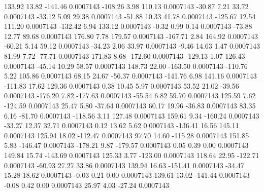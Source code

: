       133.92       13.82     -141.46     0.0007143
     -108.26        3.98      110.13     0.0007143
      -30.87        7.21       33.72     0.0007143
      -33.12        5.09       29.38     0.0007143
      -51.88       10.33       41.78     0.0007143
     -125.67       12.54      111.20     0.0007143
     -132.42        6.94      133.12     0.0007143
       -0.32        0.99        0.14     0.0007143
      -73.88       12.77       89.68     0.0007143
      176.80        7.78      179.57     0.0007143
     -167.71        2.84      164.92     0.0007143
      -60.21        5.14       59.12     0.0007143
      -34.23        2.06       33.97     0.0007143
       -9.46       14.63        1.47     0.0007143
       81.99        7.72      -77.71     0.0007143
      171.83        8.68     -172.60     0.0007143
     -129.13        1.07      126.43     0.0007143
      -45.14       10.29       58.57     0.0007143
      148.73       22.00     -163.50     0.0007143
     -110.76        5.22      105.86     0.0007143
       68.15       24.67      -56.37     0.0007143
     -141.76        6.98      141.16     0.0007143
     -111.83       17.62      129.36     0.0007143
        0.38       10.45        5.97     0.0007143
       53.52       21.02      -39.56     0.0007143
     -176.20        7.82     -177.63     0.0007143
      -55.54        6.82       59.70     0.0007143
      125.59        7.62     -124.59     0.0007143
       25.47        5.80      -37.64     0.0007143
       60.17       19.96      -36.83     0.0007143
       83.35        6.16      -81.70     0.0007143
     -118.56        3.11      127.48     0.0007143
      159.61        9.34     -160.24     0.0007143
      -33.27       12.37       32.71     0.0007143
        0.12       13.62        5.62     0.0007143
     -136.41       16.56      145.11     0.0007143
      125.94       18.02     -112.47     0.0007143
       97.70       14.60     -115.28     0.0007143
      151.85        5.83     -146.47     0.0007143
     -178.21        9.87     -179.57     0.0007143
        0.05        0.39        0.00     0.0007143
      149.84       15.74     -143.69     0.0007143
      125.33        3.77     -123.00     0.0007143
      118.64       22.95     -122.71     0.0007143
      -60.93       27.27       33.86     0.0007143
      139.94       16.63     -151.41     0.0007143
      -34.47       15.28       18.62     0.0007143
       -0.03        0.21        0.00     0.0007143
      139.61       13.02     -141.44     0.0007143
       -0.08        0.42        0.00     0.0007143
       25.97        4.03      -27.24     0.0007143
